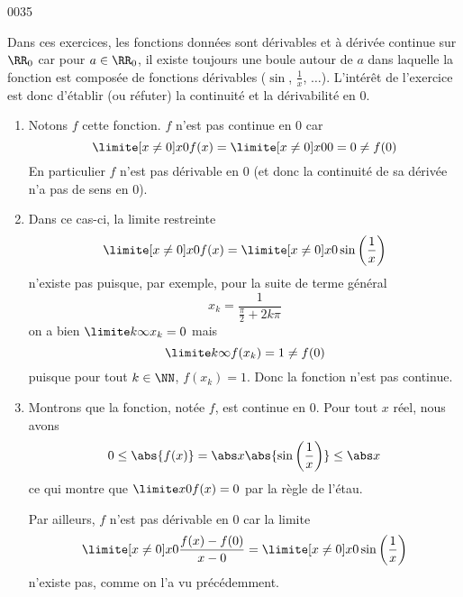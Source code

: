 
\begin{corrige}{0035}


Dans ces exercices, les fonctions données sont dérivables et à dérivée
continue sur $\RR_0$ car pour $a \in \RR_0$, il existe toujours une
boule autour de $a$ dans laquelle la fonction est composée de
fonctions dérivables ($\sin$, $\frac 1x$, $\ldots$). L'intérêt de
l'exercice est donc d'établir (ou réfuter) la continuité et la
dérivabilité en $0$.

\begin{enumerate}

\item 
 Notons $f$ cette fonction. $f$ n'est pas continue en $0$ car
\begin{equation*}
  \limite[x \neq 0] x 0 f(x) = \limite[x \neq 0] x 0 0 = 0 \neq f(0)
\end{equation*}
En particulier $f$ n'est pas dérivable en $0$ (et donc la continuité
de sa dérivée n'a pas de sens en $0$).

\item
Dans ce cas-ci, la limite \og restreinte\fg{}
\begin{equation*}
  \limite[x \neq 0] x 0 f(x) = \limite[x \neq 0] x 0 \sin\left(\frac 1 x\right)
\end{equation*}
n'existe pas puisque, par exemple, pour la suite de terme général
\begin{equation*}
  x_k = \frac 1 {\frac \pi 2 + 2k \pi}
\end{equation*}
on a bien $\limite k \infty x_k = 0$ mais
\begin{equation*}
  \limite k \infty f(x_k) = 1 \neq f(0)
\end{equation*}
puisque pour tout $k \in \NN$, $f(x_k) = 1$. Donc la fonction n'est pas continue.

\item
Montrons que la fonction, notée $f$, est continue en $0$. Pour tout $x$ réel, nous avons
\begin{equation*}
  0 \leq \abs{f(x)} = \abs x \abs{\sin \left(\frac 1 x\right)} \leq
  \abs x
\end{equation*}
ce qui montre que $\limite x 0 f(x) = 0$ par la règle de l'étau.

Par ailleurs, $f$ n'est pas dérivable en $0$ car la limite
\begin{equation*}
  \limite[x \neq 0] x 0 \frac{f(x) - f(0)}{x-0} = \limite[x\neq 0] x 0 \sin\left(\frac{1}{x}\right)
\end{equation*}
n'existe pas, comme on l'a vu précédemment.


\end{enumerate}
\end{corrige}
